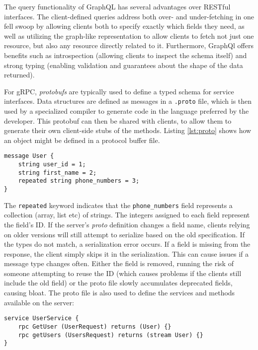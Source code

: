The query functionality of GraphQL has several advantages over RESTful interfaces. The client-defined queries address both over- and under-fetching in one fell swoop by allowing clients both to specify exactly which fields they need, as well as utilizing the graph-like representation to allow clients to fetch not just one resource, but also any resource directly related to it. Furthermore, GraphQl offers benefits such as introspection (allowing clients to inspect the schema itself) and strong typing (enabling validation and guarantees about the shape of the data returned).

For gRPC, \textit{protobufs} are typically used to define a typed schema for service interfaces. Data structures are defined as messages in a \texttt{.proto} file, which is then used by a specialized compiler to generate code in the language preferred by the developer. This protobuf can then be shared with clients, to allow them to generate their own client-side stubs of the methods. Listing \ref{lst:proto} shows how an object might be defined in a protocol buffer file.
\begin{lstlisting}[caption={An example gRPC protocol buffer message definition}, captionpos=b,label={lst:proto}]
message User {
    string user_id = 1;
    string first_name = 2;
    repeated string phone_numbers = 3;
}
\end{lstlisting}
The \texttt{repeated} keyword indicates that the \texttt{phone\_numbers} field represents a collection (array, list etc) of strings. 
The integers assigned to each field represent the field's ID. If the server's \textit{proto} definition changes a field name, clients relying on older versions will still attempt to serialize based on the old specification. If the types do not match, a serialization error occurs. If a field is missing from the response, the client simply skips it in the serialization. This can cause issues if a message type changes often. Either the field is removed, running the risk of someone attempting to reuse the ID (which causes problems if the clients still include the old field) or the proto file slowly accumulates deprecated fields, causing bloat. 
The proto file is also used to define the services and methods available on the server:
\begin{lstlisting}[caption={An example gRPC protocol buffer service definition}, captionpos=b]
service UserService {
    rpc GetUser (UserRequest) returns (User) {}
    rpc getUsers (UsersRequest) returns (stream User) {}
}
\end{lstlisting}
